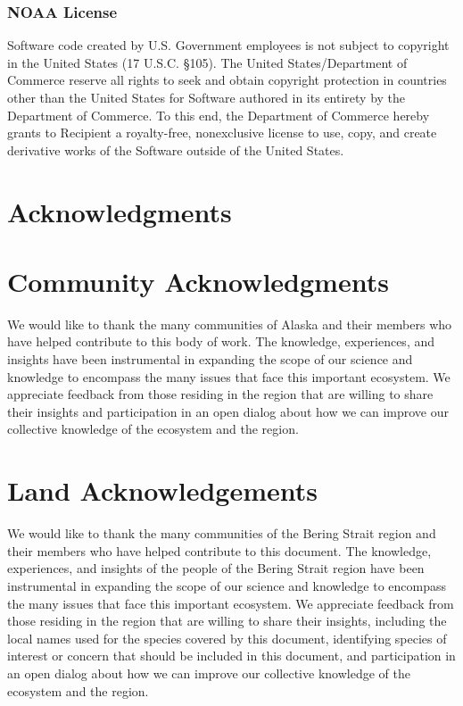 \documentclass[
  letterpaper,
  oneside,
  open=any]{scrbook}
\begin{document}
\subsection{NOAA License}\label{noaa-license-1}

Software code created by U.S. Government employees is not subject to
copyright in the United States (17 U.S.C. §105). The United
States/Department of Commerce reserve all rights to seek and obtain
copyright protection in countries other than the United States for
Software authored in its entirety by the Department of Commerce. To this
end, the Department of Commerce hereby grants to Recipient a
royalty-free, nonexclusive license to use, copy, and create derivative
works of the Software outside of the United States.

\chapter{Acknowledgments}\label{acknowledgments}

\chapter{Community Acknowledgments}\label{community-acknowledgments}

We would like to thank the many communities of Alaska and their members
who have helped contribute to this body of work. The knowledge,
experiences, and insights have been instrumental in expanding the scope
of our science and knowledge to encompass the many issues that face this
important ecosystem. We appreciate feedback from those residing in the
region that are willing to share their insights and participation in an
open dialog about how we can improve our collective knowledge of the
ecosystem and the region.

\chapter{Land Acknowledgements}\label{land-acknowledgements}

We would like to thank the many communities of the Bering Strait region
and their members who have helped contribute to this document. The
knowledge, experiences, and insights of the people of the Bering Strait
region have been instrumental in expanding the scope of our science and
knowledge to encompass the many issues that face this important
ecosystem. We appreciate feedback from those residing in the region that
are willing to share their insights, including the local names used for
the species covered by this document, identifying species of interest or
concern that should be included in this document, and participation in
an open dialog about how we can improve our collective knowledge of the
ecosystem and the region.
\end{document}
